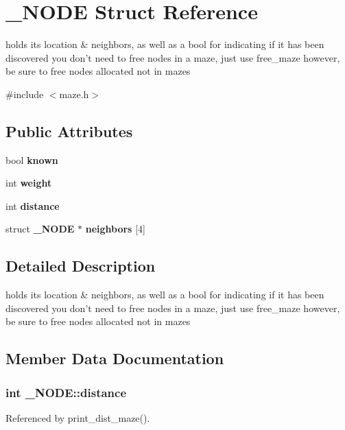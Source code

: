 \section{\-\_\-\-N\-O\-D\-E Struct Reference}
\label{struct__NODE}


holds its location \& neighbors, as well as a bool for indicating if it has been discovered you don't need to free nodes in a maze, just use free\-\_\-maze however, be sure to free nodes allocated not in mazes  




{\ttfamily \#include $<$maze.\-h$>$}

\subsection*{Public Attributes}
\begin{DoxyCompactItemize}
\item 
bool {\bf known}
\item 
int {\bf weight}
\item 
int {\bf distance}
\item 
struct {\bf \-\_\-\-N\-O\-D\-E} $\ast$ {\bf neighbors} [4]
\end{DoxyCompactItemize}


\subsection{Detailed Description}
holds its location \& neighbors, as well as a bool for indicating if it has been discovered you don't need to free nodes in a maze, just use free\-\_\-maze however, be sure to free nodes allocated not in mazes 

\subsection{Member Data Documentation}
\subsubsection[{distance}]{\setlength{\rightskip}{0pt plus 5cm}int \-\_\-\-N\-O\-D\-E\-::distance}\label{struct__NODE_a6da4411a570a71b33e7ea9afed281c39}


Referenced by print\-\_\-dist\-\_\-maze().

